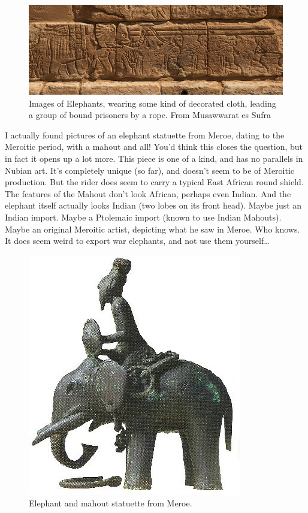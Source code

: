 \documentclass[a4paper,12pt]{scrreprt}
\begin{document}
\begin{figure}[H]
	\centering
	\includegraphics[width=\textwidth]{img/slaves_and_elephant}
	\caption{Images of Elephants, wearing some kind of decorated cloth, leading a group of bound prisoners by a rope. From Musawwarat es Sufra}
\end{figure}

I actually found pictures of an elephant statuette from Meroe, dating to the Meroitic period, with a mahout and all! You'd think this closes the question, but in fact it opens up a lot more. This piece is one of a kind, and has no parallels in Nubian art. It's completely unique (so far), and doesn't seem to be of Meroitic production. But the rider does seem to carry a typical East African round shield. The features of the Mahout don't look African, perhaps even Indian. And the elephant itself actually looks Indian (two lobes on its front head). Maybe just an Indian import. Maybe a Ptolemaic import (known to use Indian Mahouts). Maybe an original Meroitic artist, depicting what he saw in Meroe. Who knows. It does seem weird to export war elephants, and not use them yourself…\\

\begin{figure}[H]
	\centering
	\includegraphics[width=\textwidth]{img/mahout_elephant}
	\caption{Elephant and mahout statuette from Meroe.}
\end{figure}
\end{document}
